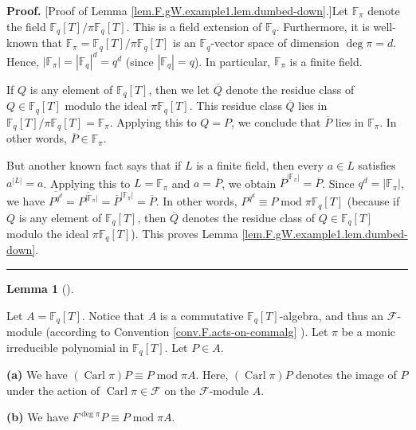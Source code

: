 \documentclass[numbers=enddot,12pt,final,onecolumn,notitlepage]{scrartcl}%
\theoremstyle{definition}
\newtheorem{lem}[theo]{Lemma}
\newenvironment{lemma}[1][]
{\begin{lem}[#1]\begin{leftbar}}
{\end{leftbar}\end{lem}}
\newenvironment{proof}[1][Proof]{\noindent\textbf{#1.} }{\ \rule{0.5em}{0.5em}}
\begin{document}
\begin{proof}
[Proof of Lemma \ref{lem.F.gW.example1.lem.dumbed-down}.]Let $\mathbb{F}_{\pi
}$ denote the field $\mathbb{F}_{q}\left[  T\right]  /\pi\mathbb{F}_{q}\left[
T\right]  $. This is a field extension of $\mathbb{F}_{q}$. Furthermore, it is
well-known that $\mathbb{F}_{\pi}=\mathbb{F}_{q}\left[  T\right]
/\pi\mathbb{F}_{q}\left[  T\right]  $ is an $\mathbb{F}_{q}$-vector space of
dimension $\deg\pi=d$. Hence, $\left\vert \mathbb{F}_{\pi}\right\vert
=\left\vert \mathbb{F}_{q}\right\vert ^{d}=q^{d}$ (since $\left\vert
\mathbb{F}_{q}\right\vert =q$). In particular, $\mathbb{F}_{\pi}$ is a finite field.

If $Q$ is any element of $\mathbb{F}_{q}\left[  T\right]  $, then we let
$\overline{Q}$ denote the residue class of $Q\in\mathbb{F}_{q}\left[
T\right]  $ modulo the ideal $\pi\mathbb{F}_{q}\left[  T\right]  $. This
residue class $\overline{Q}$ lies in $\mathbb{F}_{q}\left[  T\right]
/\pi\mathbb{F}_{q}\left[  T\right]  =\mathbb{F}_{\pi}$. Applying this to
$Q=P$, we conclude that $\overline{P}$ lies in $\mathbb{F}_{\pi}$. In other
words, $\overline{P}\in\mathbb{F}_{\pi}$.

But another known fact says that if $L$ is a finite field, then every $a\in L$
satisfies $a^{\left\vert L\right\vert }=a$. Applying this to $L=\mathbb{F}%
_{\pi}$ and $a=\overline{P}$, we obtain $\overline{P}^{\left\vert
\mathbb{F}_{\pi}\right\vert }=\overline{P}$. Since $q^{d}=\left\vert
\mathbb{F}_{\pi}\right\vert $, we have $\overline{P^{q^{d}}}=\overline
{P^{\left\vert \mathbb{F}_{\pi}\right\vert }}=\overline{P}^{\left\vert
\mathbb{F}_{\pi}\right\vert }=\overline{P}$. In other words, $P^{q^{d}}\equiv
P\operatorname{mod}\pi\mathbb{F}_{q}\left[  T\right]  $ (because if $Q$ is any
element of $\mathbb{F}_{q}\left[  T\right]  $, then $\overline{Q}$ denotes the
residue class of $Q\in\mathbb{F}_{q}\left[  T\right]  $ modulo the ideal
$\pi\mathbb{F}_{q}\left[  T\right]  $). This proves Lemma
\ref{lem.F.gW.example1.lem.dumbed-down}.
\end{proof}

\begin{lemma}
\label{lem.F.gW.example1.lem}Let $A=\mathbb{F}_{q}\left[  T\right]  $. Notice
that $A$ is a commutative $\mathbb{F}_{q}\left[  T\right]  $-algebra, and thus
an $\mathcal{F}$-module (according to Convention \ref{conv.F.acts-on-commalg}%
). Let $\pi$ be a monic irreducible polynomial in $\mathbb{F}_{q}\left[
T\right]  $. Let $P\in A$.

\textbf{(a)} We have $\left(  \operatorname*{Carl}\pi\right)  P\equiv
P\operatorname{mod}\pi A$. Here, $\left(  \operatorname*{Carl}\pi\right)  P$
denotes the image of $P$ under the action of $\operatorname*{Carl}\pi
\in\mathcal{F}$ on the $\mathcal{F}$-module $A$.

\textbf{(b)} We have $F^{\deg\pi}P\equiv P\operatorname{mod}\pi A$.
\end{lemma}
\end{document}
